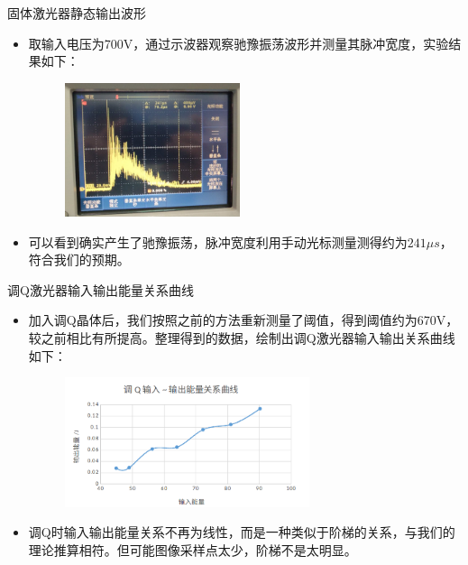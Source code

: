 \documentclass{beamer}
\begin{document}
\begin{frame}{固体激光器静态输出波形}
  \begin{itemize}
    \item 取输入电压为700V，通过示波器观察驰豫振荡波形并测量其脉冲宽度，实验结果如下：
    \begin{figure}
      \includegraphics[height=3.92cm,width=5.14cm]{images/8.png}
      \label{fg7}
    \end{figure}
    \item 可以看到确实产生了驰豫振荡，脉冲宽度利用手动光标测量测得约为\(241\mu s\)，符合我们的预期。
  \end{itemize}
\end{frame}
\begin{frame}{调Q激光器输入输出能量关系曲线}
  \begin{itemize}
    \item 加入调Q晶体后，我们按照之前的方法重新测量了阈值，得到阈值约为670V，较之前相比有所提高。整理得到的数据，绘制出调Q激光器输入输出关系曲线如下：
    \begin{figure}
      \includegraphics[height=3.8cm,width=7.2cm]{images/9.png}
      \label{fg7}
    \end{figure}
    \item 调Q时输入输出能量关系不再为线性，而是一种类似于阶梯的关系，与我们的理论推算相符。但可能图像采样点太少，阶梯不是太明显。
  \end{itemize}
\end{frame}
\end{document}
